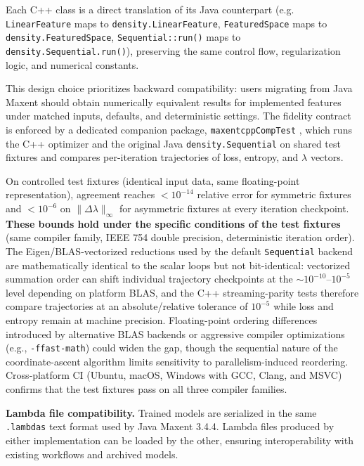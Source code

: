 \documentclass[10pt,letterpaper]{article}
\begin{document}
Each C++ class is a direct translation of its Java counterpart (e.g.
\texttt{LinearFeature} maps to \texttt{density.LinearFeature},
\texttt{FeaturedSpace} maps to \texttt{density.FeaturedSpace},
\texttt{Sequential::run()} maps to \texttt{density.Sequential.run()}),
preserving the same control flow, regularization logic, and numerical
constants.

This design choice prioritizes backward compatibility: users migrating
from Java Maxent should obtain numerically equivalent results for
implemented features under matched inputs, defaults, and deterministic
settings. The fidelity contract is enforced by a dedicated companion
package, \texttt{maxentcppCompTest} \cite{maxentcppCompTest2025}, which
runs the C++ optimizer and the original Java \texttt{density.Sequential}
on shared test fixtures and compares per-iteration trajectories of loss,
entropy, and \(\lambda\) vectors.

On controlled test fixtures (identical input data, same floating-point
representation), agreement reaches \(< 10^{-14}\) relative error for
symmetric fixtures and \(< 10^{-6}\) on \(\|\Delta\lambda\|_\infty\) for
asymmetric fixtures at every iteration checkpoint. \textbf{These bounds
hold under the specific conditions of the test fixtures} (same compiler
family, IEEE 754 double precision, deterministic iteration order). The
Eigen/BLAS-vectorized reductions used by the default \texttt{Sequential}
backend are mathematically identical to the scalar loops but not
bit-identical: vectorized summation order can shift individual
trajectory checkpoints at the \(\sim 10^{-10}\)--\(10^{-5}\) level
depending on platform BLAS, and the C++ streaming-parity tests therefore
compare trajectories at an absolute/relative tolerance of \(10^{-5}\)
while loss and entropy remain at machine precision. Floating-point
ordering differences introduced by alternative BLAS backends or
aggressive compiler optimizations (e.g., \texttt{-ffast-math}) could
widen the gap, though the sequential nature of the coordinate-ascent
algorithm limits sensitivity to parallelism-induced reordering.
Cross-platform CI (Ubuntu, macOS, Windows with GCC, Clang, and MSVC)
confirms that the test fixtures pass on all three compiler families.

\textbf{Lambda file compatibility.} Trained models are serialized in the
same \texttt{.lambdas} text format used by Java Maxent 3.4.4. Lambda
files produced by either implementation can be loaded by the other,
ensuring interoperability with existing workflows and archived models.
\end{document}
